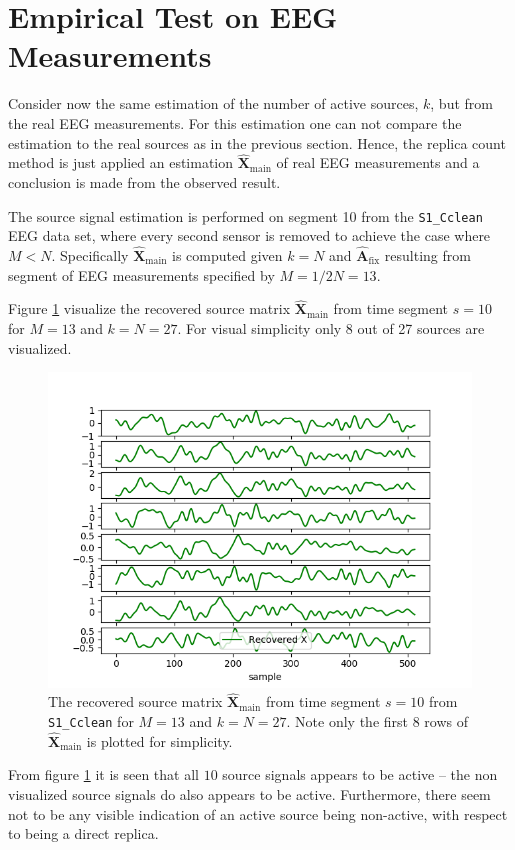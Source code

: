 \section{Empirical Test on EEG Measurements}
Consider now the same estimation of the number of active sources, $k$, but from the real EEG measurements. 
For this estimation one can not compare the estimation to the real sources as in the previous section.
Hence, the replica count method is just applied an estimation $\hat{\mathbf{X}}_{\text{main}}$ of real EEG measurements and a conclusion is made from the observed result.

The source signal estimation is performed on segment 10 from the \texttt{S1\_Cclean} EEG data set, where every second sensor is removed to achieve the case where $M < N$. 
Specifically $\hat{\mathbf{X}}_{\text{main}}$ is computed given $k = N$ and $\hat{\textbf{A}}_{\text{fix}}$ resulting from segment of EEG measurements specified by $M = 1/2 N = 13$. 

Figure \ref{fig:eeg_k} visualize the recovered source matrix $\hat{\mathbf{X}}_{\text{main}}$ from time segment $s = 10$ for $M = 13$ and $k = N = 27$. For visual simplicity only 8 out of 27 sources are visualized.
\begin{figure}[H]
    \centering
	\includegraphics[scale=0.5]{figures/ch_estimate/eeg_k_timeseg_10.png}
	\caption{The recovered source matrix $\hat{\mathbf{X}}_{\text{main}}$ from time segment $s = 10$ from \texttt{S1\_Cclean} for $M = 13$ and $k = N = 27$. Note only the first 8 rows of $\hat{\mathbf{X}}_{\text{main}}$ is plotted for simplicity.}
	\label{fig:eeg_k}
\end{figure}
\noindent
From figure \ref{fig:eeg_k} it is seen that all $10$ source signals appears to be active -- the non visualized source signals do also appears to be active.
Furthermore, there seem not to be any visible indication of an active source being non-active, with respect to being a direct replica. 

